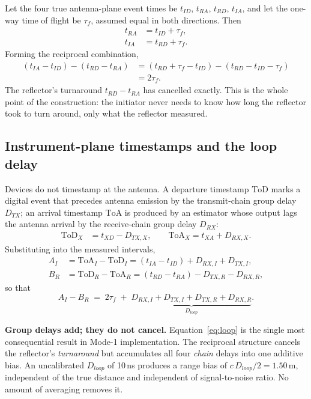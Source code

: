 \documentclass[11pt,a4paper]{article}
\newcommand{\ToD}{\mathrm{ToD}}
\newcommand{\ToA}{\mathrm{ToA}}
\begin{document}
Let the four true antenna-plane event times be $t_{ID}$, $t_{RA}$, $t_{RD}$, $t_{IA}$, and let the
one-way time of flight be $\tau_f$, assumed equal in both directions. Then
\begin{align}
t_{RA} &= t_{ID} + \tau_f, \label{eq:prop1}\\
t_{IA} &= t_{RD} + \tau_f. \label{eq:prop2}
\end{align}
Forming the reciprocal combination,
\begin{align}
(t_{IA}-t_{ID}) - (t_{RD}-t_{RA})
 &= (t_{RD}+\tau_f-t_{ID}) - (t_{RD}-t_{ID}-\tau_f) \nonumber \\
 &= 2\tau_f . \label{eq:rttideal}
\end{align}
The reflector's turnaround $t_{RD}-t_{RA}$ has cancelled exactly. This is the whole point of the
construction: the initiator never needs to know how long the reflector took to turn around, only
what the reflector measured.

\subsection{Instrument-plane timestamps and the loop delay}
\label{sec:groupdelay}

Devices do not timestamp at the antenna. A departure timestamp $\ToD$ marks a digital event that
precedes antenna emission by the transmit-chain group delay $D_{TX}$; an arrival timestamp $\ToA$
is produced by an estimator whose output lags the antenna arrival by the receive-chain group delay
$D_{RX}$:
\begin{align}
\ToD_X &= t_{XD} - D_{TX,X}, \qquad
\ToA_X = t_{XA} + D_{RX,X}. \label{eq:instrument}
\end{align}
Substituting into the measured intervals,
\begin{align}
A_I &= \ToA_I - \ToD_I = (t_{IA}-t_{ID}) + D_{RX,I} + D_{TX,I}, \label{eq:AI}\\
B_R &= \ToD_R - \ToA_R = (t_{RD}-t_{RA}) - D_{TX,R} - D_{RX,R}, \label{eq:BR}
\end{align}
so that
\begin{equation}
A_I - B_R \;=\; 2\tau_f \;+\; \underbrace{D_{RX,I}+D_{TX,I}+D_{TX,R}+D_{RX,R}}_{\textstyle D_{loop}} .
\label{eq:loop}
\end{equation}

\begin{callout}
\textbf{Group delays add; they do not cancel.} Equation~\eqref{eq:loop} is the single most
consequential result in Mode-1 implementation. The reciprocal structure cancels the reflector's
\emph{turnaround} but accumulates all four \emph{chain} delays into one additive bias. An
uncalibrated $D_{loop}$ of 10\,ns produces a range bias of $c\,D_{loop}/2 = 1.50$\,m, independent
of the true distance and independent of signal-to-noise ratio. No amount of averaging removes it.
\end{callout}
\end{document}

